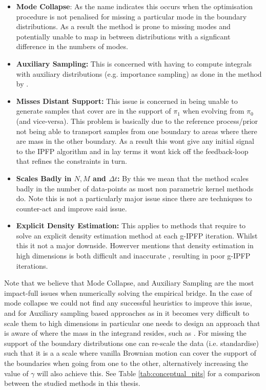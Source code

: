 \documentclass[a4paper,12pt,twoside,openright]{report}
\theoremstyle{definition}
\begin{document}
\begin{itemize}
    \item \textbf{Mode Collapse}: As the name indicates this occurs when the optimisation procedure is not penalised for missing a particular mode in the boundary distributions. As a result the method is prone to missing modes and potentially unable to map in between distributions with a signficant difference in the numbers of modes.
    \item \textbf{Auxiliary Sampling:} This is concerned with having to compute integrals with auxiliary distributions (e.g. importance sampling) as done in the method by \cite{pavon2018data}.
    \item \textbf{Misses Distant Support:} This issue is concerned in being unable to generate samples that cover are in the support of $\pi_1$ when evolving from $\pi_0$ (and vice-versa). This problem is basically due to the reference process/prior not being able to transport samples from one boundary to areas where there are mass in the other boundary. As a result this wont give any initial signal to the IPFP algorithm and in lay terms it wont kick off the feedback-loop that refines the constraints in turn.
    \item \textbf{Scales Badly in $N,M$ and $\Delta t$:} By this we mean that the method scales badly in the number of data-points as most non parametric kernel methods do. Note this is not a particularly major issue since there are techniques to counter-act and improve said issue. 
    \item \textbf{Explicit Density Estimation:} This applies to methods that require to solve an explicit density estimation method at each g-IPFP iteration. Whilst this it not a major downside. Howerver \cite{pavon2018data} mentions that density estimation in high dimensions is both difficult and inaccurate , resulting in poor g-IPFP iterations.
\end{itemize}
Note that we believe that Mode Collapse, and Auxiliary Sampling are the most impact-full issues when numerically solving the empirical bridge. In the case of mode collapse we could not find any successful heuristics to improve this issue, and for Auxiliary sampling based approaches as in \cite{pavon2018data} it becomes very difficult to scale them to high dimensions in particular one needs to design an approach that is aware of where the mass in the integrand resides, such as \cite{osborne2012active}.  For missing the support of the boundary distributions one can re-scale the data (i.e. standardise) such that it is a a scale where vanilla Brownian motion can cover the support of the boundaries when going from one to the other, alternatively increasing the value of $\gamma$ will also achieve this. See Table \ref{tab:conceptual_pits} for a comparison between the studied methods in this thesis.
\end{document}
